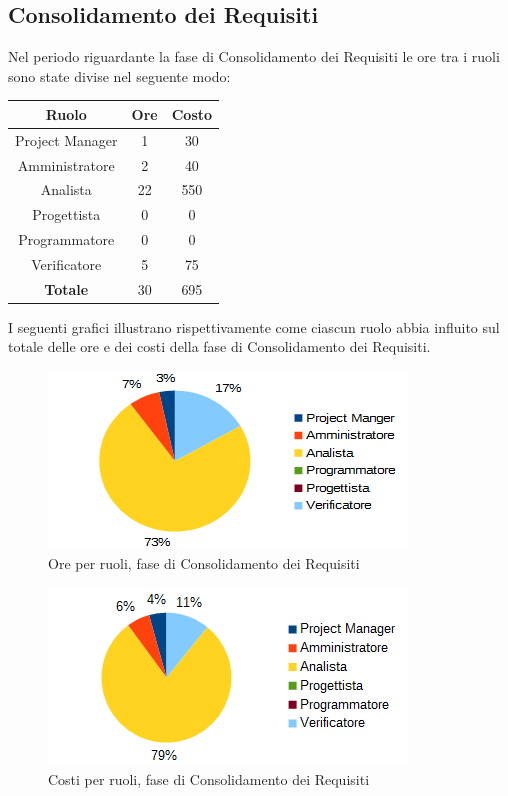 	\subsection{Consolidamento dei Requisiti}
	Nel periodo riguardante la fase di Consolidamento dei Requisiti le ore tra i ruoli sono state divise nel seguente modo: \\
	\begin{table}[H]
		\centering
		\begin{tabular}{|c|c|c|}
			\hline
			\textbf{Ruolo}		& \textbf{Ore}	& \textbf{Costo} \\
			\hline
			Project Manager		& 1				& 30	\\
			Amministratore		& 2				& 40	\\
			Analista			& 22			& 550	\\
			Progettista			& 0				& 0	\\
			Programmatore		& 0				& 0	\\
			Verificatore		& 5				& 75	\\
			\hline
			\textbf{Totale}		& 30			& 695	\\
			\hline
		\end{tabular}
		\end{table}
	I seguenti grafici illustrano rispettivamente come ciascun ruolo abbia influito sul totale
delle ore e dei costi della fase di Consolidamento dei Requisiti. \\
	\begin{figure}[H]
		\centering
		\includegraphics[scale=1]{immagini/grafici/analisi_dettaglio-torta.png}
		\caption{Ore per ruoli, fase di Consolidamento dei Requisiti}
	\end{figure}
	\begin{figure}[H]
		\centering
		\includegraphics[scale=1]{immagini/grafici/analisi_dettaglio-torta-costo.png}
		\caption{Costi per ruoli, fase di Consolidamento dei Requisiti}
	\end{figure}
